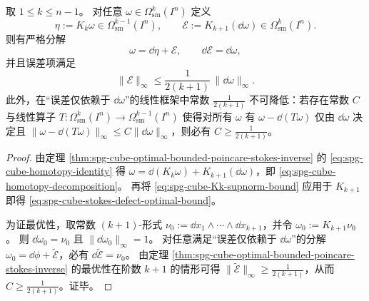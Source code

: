 \begin{theorem}\label{thm:spg-cube-homotopy-decomposition-and-stokes-defect}
取 \(1\le k\le n-1\)。
对任意 \(\omega\in\Omega^k_{\mathrm{sm}}(I^n)\) 定义
\[
\eta:=K_k\omega\in\Omega^{k-1}_{\mathrm{sm}}(I^n),
\qquad
\mathcal{E}:=K_{k+1}(\dd\omega)\in\Omega^{k}_{\mathrm{sm}}(I^n).
\]
则有严格分解
\begin{equation}\label{eq:spg-cube-homotopy-decomposition}
\omega=\dd\eta+\mathcal{E},
\qquad
\dd\mathcal{E}=\dd\omega,
\end{equation}
并且误差项满足
\begin{equation}\label{eq:spg-cube-stokes-defect-optimal-bound}
\|\mathcal{E}\|_\infty\le \frac{1}{2(k+1)}\,\|\dd\omega\|_\infty.
\end{equation}
此外，在“误差仅依赖于 \(\dd\omega\)”的线性框架中常数 \(\frac{1}{2(k+1)}\) 不可降低：若存在常数 \(C\) 与线性算子 \(T:\Omega^k_{\mathrm{sm}}(I^n)\to\Omega^{k-1}_{\mathrm{sm}}(I^n)\) 使得对所有 \(\omega\) 有 \(\omega-\dd(T\omega)\) 仅由 \(\dd\omega\) 决定且
\(
\|\omega-\dd(T\omega)\|_\infty\le C\|\dd\omega\|_\infty
\)，则必有 \(C\ge \frac{1}{2(k+1)}\)。
\end{theorem}
\begin{proof}
由定理 \ref{thm:spg-cube-optimal-bounded-poincare-stokes-inverse} 的 \eqref{eq:spg-cube-homotopy-identity} 得 \(\omega=\dd(K_k\omega)+K_{k+1}(\dd\omega)\)，即 \eqref{eq:spg-cube-homotopy-decomposition}。
再将 \eqref{eq:spg-cube-Kk-supnorm-bound} 应用于 \(K_{k+1}\) 即得 \eqref{eq:spg-cube-stokes-defect-optimal-bound}。
\par
为证最优性，取常数 \((k+1)\)-形式 \(\nu_0:=\dd x_1\wedge\cdots\wedge \dd x_{k+1}\)，并令 \(\omega_0:=K_{k+1}\nu_0\)。
则 \(\dd\omega_0=\nu_0\) 且 \(\|\dd\omega_0\|_\infty=1\)。
对任意满足“误差仅依赖于 \(\dd\omega\)”的分解 \(\omega_0=\dd\phi+\widetilde{\mathcal{E}}\)，必有 \(\dd\widetilde{\mathcal{E}}=\nu_0\)。
由定理 \ref{thm:spg-cube-optimal-bounded-poincare-stokes-inverse} 的最优性在阶数 \(k+1\) 的情形可得
\(
\|\widetilde{\mathcal{E}}\|_\infty\ge \frac{1}{2(k+1)}
\)，从而 \(C\ge \frac{1}{2(k+1)}\)。证毕。
\end{proof}

